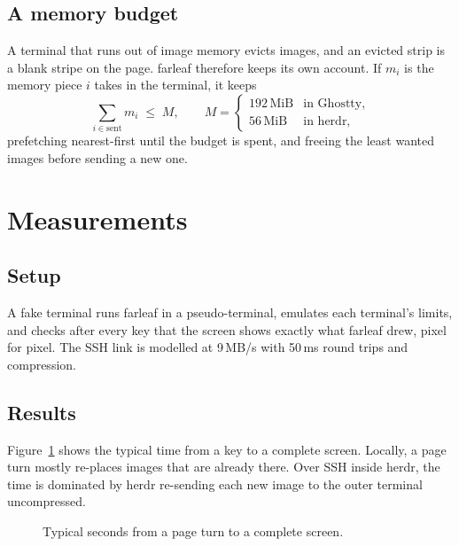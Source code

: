 \documentclass[12pt]{article}
\begin{document}
\subsection{A memory budget}

A terminal that runs out of image memory evicts images, and an evicted strip
is a blank stripe on the page. farleaf therefore keeps its own account. If
$m_i$ is the memory piece $i$ takes in the terminal, it keeps
\begin{equation}
  \sum_{i \in \text{sent}} m_i \;\le\; M,
  \qquad M = \begin{cases}
    192\,\text{MiB} & \text{in Ghostty,}\\
    56\,\text{MiB} & \text{in herdr,}
  \end{cases}
\end{equation}
prefetching nearest-first until the budget is spent, and freeing the least
wanted images before sending a new one.

\section{Measurements}

\subsection{Setup}

A fake terminal runs farleaf in a pseudo-terminal, emulates each terminal's
limits, and checks after every key that the screen shows exactly what farleaf
drew, pixel for pixel. The SSH link is modelled at 9\,MB/s with 50\,ms round
trips and compression.

\subsection{Results}

Figure~\ref{fig:latency} shows the typical time from a key to a complete
screen. Locally, a page turn mostly re-places images that are already there.
Over SSH inside herdr, the time is dominated by herdr re-sending each new
image to the outer terminal uncompressed.

\begin{figure}[h]
  \centering
  \caption{Typical seconds from a page turn to a complete screen.}
  \label{fig:latency}
\end{figure}
\end{document}
